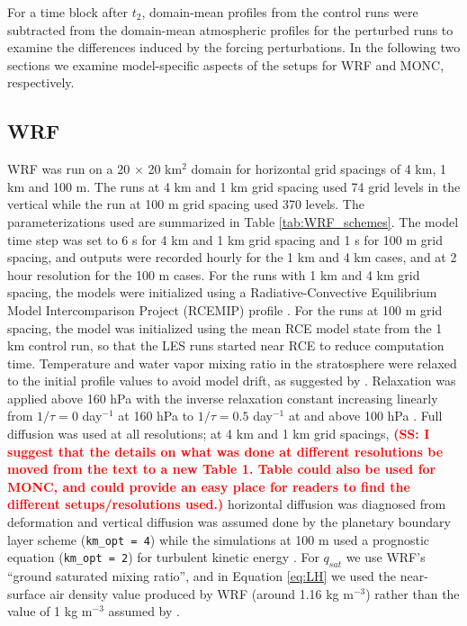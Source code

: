\documentclass[draft]{agujournal2019}
\newcommand{\todo}[1]{\textcolor{red}{\textbf{(#1)}}}
\begin{document}
For a time block after $t_2$, domain-mean profiles from the control runs were
subtracted from the domain-mean atmospheric profiles for the perturbed runs to
examine the differences induced by the forcing perturbations. In the following
two sections we examine model-specific aspects of the setups for WRF and MONC,
respectively.

\subsection{WRF}

WRF was run on a 20 $\times$ 20 km$^2$ domain for horizontal grid spacings of 4
km, 1 km and 100 m. The runs at 4 km and 1 km grid spacing used 74 grid
levels in the vertical while the run at 100 m grid spacing used 370 levels. The
parameterizations used are summarized in Table \ref{tab:WRF_schemes}. The model
time step was set to 6 s for 4 km and 1 km grid spacing and 1 s for 100 m grid
spacing, and outputs were recorded hourly for the 1 km and 4 km cases, and at 2
hour resolution for the 100 m cases. For the runs with 1 km and 4 km grid
spacing, the models were initialized using a Radiative-Convective Equilibrium
Model Intercomparison Project (RCEMIP) profile \cite{Wing_GMD_2018}. For the
runs at 100 m grid spacing, the model was initialized using the mean RCE model
state from the 1 km control run, so that the LES runs started near RCE to reduce
computation time. Temperature and water vapor mixing ratio in the stratosphere
were relaxed to the initial profile values to avoid model drift, as suggested by
. Relaxation was applied above 160 hPa with the inverse
relaxation constant increasing linearly from $1/\tau = 0$ day$^{-1}$ at 160 hPa
to $1/\tau = 0.5$ day$^{-1}$ at and above 100 hPa \cite{Herman_JAMES_2013}. Full
diffusion was used at all resolutions; at 4 km and 1 km grid spacings,  \todo{SS: I suggest that the details on what was done at different resolutions be moved from the text to a new Table 1.  Table could also be used for MONC, and could provide an easy place for readers to find the different setups/resolutions used.} horizontal
diffusion was diagnosed from deformation and vertical diffusion was assumed done
by the planetary boundary layer scheme (\texttt{km\_opt = 4}) while the
simulations at 100 m used a prognostic equation (\texttt{km\_opt = 2}) for
turbulent kinetic energy \cite{Skamarock_2019}. For $q_{sat}$ we use WRF's
``ground saturated mixing ratio'', and in Equation \ref{eq:LH} we used the
near-surface air density value produced by WRF (around 1.16 kg m$^{-3}$) rather
than the value of 1 kg m$^{-3}$ assumed by .
\end{document}
